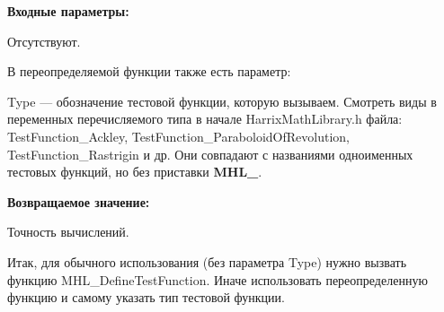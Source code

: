 \textbf{Входные параметры:}

Отсутствуют.

В переопределяемой функции также есть параметр:
  
Type --- обозначение тестовой функции, которую вызываем.
Смотреть виды в переменных перечисляемого типа в начале HarrixMathLibrary.h файла: TestFunction\_Ackley, TestFunction\_ParaboloidOfRevolution, TestFunction\_Rastrigin и др. Они совпадают с названиями одноименных тестовых функций, но без приставки \textbf{MHL\_}.

\textbf{Возвращаемое значение:}
 
Точность вычислений.

Итак, для обычного использования (без параметра Type) нужно вызвать функцию MHL\_DefineTestFunction. Иначе использовать переопределенную функцию и самому указать тип тестовой функции.